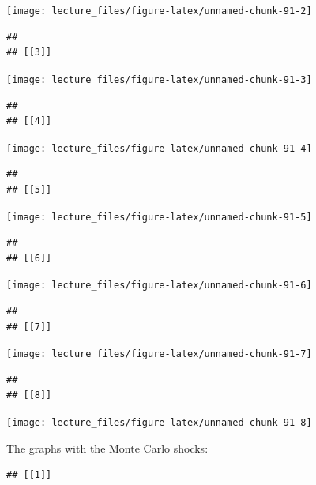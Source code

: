 \documentclass[
]{book}
\begin{document}
\begin{center}\texttt{[image: lecture\_files/figure-latex/unnamed-chunk-91-2]} \end{center}

\begin{verbatim}
## 
## [[3]]
\end{verbatim}

\begin{center}\texttt{[image: lecture\_files/figure-latex/unnamed-chunk-91-3]} \end{center}

\begin{verbatim}
## 
## [[4]]
\end{verbatim}

\begin{center}\texttt{[image: lecture\_files/figure-latex/unnamed-chunk-91-4]} \end{center}

\begin{verbatim}
## 
## [[5]]
\end{verbatim}

\begin{center}\texttt{[image: lecture\_files/figure-latex/unnamed-chunk-91-5]} \end{center}

\begin{verbatim}
## 
## [[6]]
\end{verbatim}

\begin{center}\texttt{[image: lecture\_files/figure-latex/unnamed-chunk-91-6]} \end{center}

\begin{verbatim}
## 
## [[7]]
\end{verbatim}

\begin{center}\texttt{[image: lecture\_files/figure-latex/unnamed-chunk-91-7]} \end{center}

\begin{verbatim}
## 
## [[8]]
\end{verbatim}

\begin{center}\texttt{[image: lecture\_files/figure-latex/unnamed-chunk-91-8]} \end{center}

The graphs with the Monte Carlo shocks:

\begin{verbatim}
## [[1]]
\end{verbatim}
\end{document}

